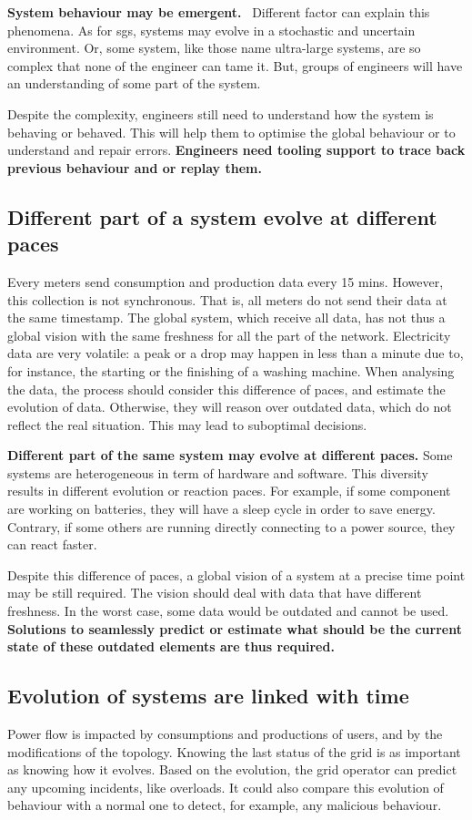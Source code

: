 \textbf{System behaviour may be emergent.}~\cite{zio2011uncertainties}
Different factor can explain this phenomena.
As for \glspl{sg}, systems may evolve in a stochastic and uncertain environment.
Or, some system, like those name ultra-large systems, are so complex that none of the engineer can tame it.
But, groups of engineers will have an understanding of some part of the system.

Despite the complexity, engineers still need to understand how the system is behaving or behaved.
This will help them to optimise the global behaviour or to understand and repair errors.
\textbf{Engineers need tooling support to trace back previous behaviour and or replay them.}


\subsection{Different part of a system evolve at different paces}
Every meters send consumption and production data every 15 mins.
However, this collection is not synchronous.
That is, all meters do not send their data at the same timestamp.
The global system, which receive all data, has not thus a global vision with the same freshness for all the part of the network.
Electricity data are very volatile: a peak or a drop may happen in less than a minute due to, for instance, the starting or the finishing of a washing machine.
When analysing the data, the process should consider this difference of paces, and estimate the evolution of data.
Otherwise, they will reason over outdated data, which do not reflect the real situation.
This may lead to suboptimal decisions.

\textbf{Different part of the same system may evolve at different paces.}
Some systems are heterogeneous in term of hardware and software.
This diversity results in different evolution or reaction paces.
For example, if some component are working on batteries, they will have a sleep cycle in order to save energy.
Contrary, if some others are running directly connecting to a power source, they can react faster.

Despite this difference of paces, a global vision of a system at a precise time point may be still required.
The vision should deal with data that have different freshness.
In the worst case, some data would be outdated and cannot be used.
\textbf{Solutions to seamlessly predict or estimate what should be the current state of these outdated elements are thus required.}


\subsection{Evolution of systems are linked with time}
Power flow is impacted by consumptions and productions of users, and by the modifications of the topology.
Knowing the last status of the grid is as important as knowing how it evolves.
Based on the evolution, the grid operator can predict any upcoming incidents, like overloads.
It could also compare this evolution of behaviour with a normal one to detect, for example, any malicious behaviour.

